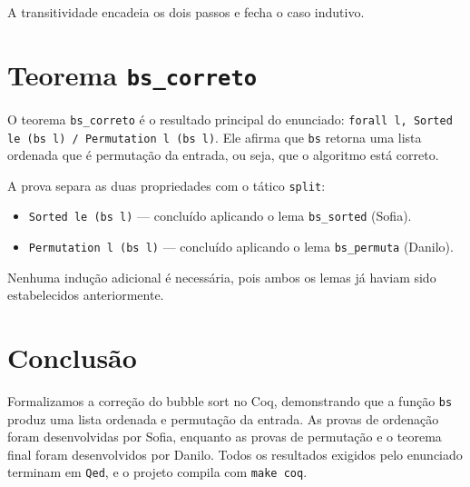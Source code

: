 \documentclass{article}
\begin{document}
A transitividade encadeia os dois passos e fecha o caso indutivo.

\section*{Teorema \texttt{bs\_correto}}

O teorema \texttt{bs\_correto} é o resultado principal do enunciado:
\texttt{forall l, Sorted le (bs l) /\ Permutation l (bs l)}.
Ele afirma que \texttt{bs} retorna uma lista ordenada que é permutação da
entrada, ou seja, que o algoritmo está correto.

A prova separa as duas propriedades com o tático \texttt{split}:
\begin{itemize}
  \item \texttt{Sorted le (bs l)} --- concluído aplicando o lema \texttt{bs\_sorted}
        (Sofia).
  \item \texttt{Permutation l (bs l)} --- concluído aplicando o lema
        \texttt{bs\_permuta} (Danilo).
\end{itemize}

Nenhuma indução adicional é necessária, pois ambos os lemas já haviam sido
estabelecidos anteriormente.

\section*{Conclusão}

Formalizamos a correção do bubble sort no Coq, demonstrando que a função
\texttt{bs} produz uma lista ordenada e permutação da entrada.
As provas de ordenação foram desenvolvidas por Sofia, enquanto as provas de
permutação e o teorema final foram desenvolvidos por Danilo.
Todos os resultados exigidos pelo enunciado terminam em \texttt{Qed}, e o
projeto compila com \texttt{make coq}.


\end{document}
